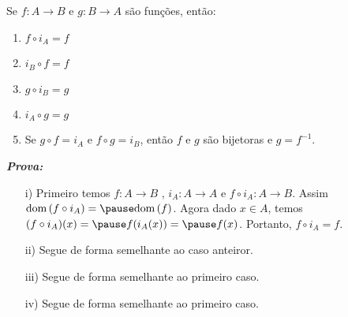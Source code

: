 \documentclass{beamer}
\begin{document}
    \begin{frame}
        \begin{proposicao}
            Se $f : A \to B$ \pause e $g : B \to A$ \pause s{\~a}o fun{\c c}{\~o}es, \pause ent{\~a}o:\pause
            \begin{enumerate}[label={\roman*})]
                \item $f\circ i_{A} = f$\pause

                \vspace{.3cm}

                \item $i_{B}\circ f = f$\pause
                
                \vspace{.3cm}

                \item $g\circ i_{B} = g$\pause

                \vspace{.3cm}

                \item $i_{A}\circ g = g$\pause

                \vspace{.3cm}

                \item Se $g\circ f = i_{A}$ \pause e $f\circ g = i_{B}$, \pause ent{\~a}o \pause $f$ e $g$ s{\~a}o bijetoras \pause e $g=f^{-1}$.\pause
            \end{enumerate}
        \end{proposicao}
    \end{frame}

    \begin{frame}
        \noindent \textbf{\textit{Prova:}}
        \begin{enumerate}
            \item[i)] Primeiro temos $f: A \to B$ \pause, $i_{A} : A \to A$ \pause e $f\circ i_{A} : A \to B$. \pause Assim \pause $\dom(f\circ i_{A}) = \pause \dom(f)$. \pause Agora dado $x \in A$, \pause temos $(f\circ i_{A})(x) = \pause f(i_{A}(x)) = \pause f(x)$. Portanto, \pause $f\circ i_{A} = f$.\pause

            \vspace{.3cm}

            \item[ii)] Segue de forma semelhante ao caso anteiror.\pause

            \vspace{.3cm}

            \item[iii)] Segue de forma semelhante ao primeiro caso.\pause

            \vspace{.3cm}

            \item[iv)] Segue de forma semelhante ao primeiro caso.\pause
        \end{enumerate}
    \end{frame}
\end{document}
